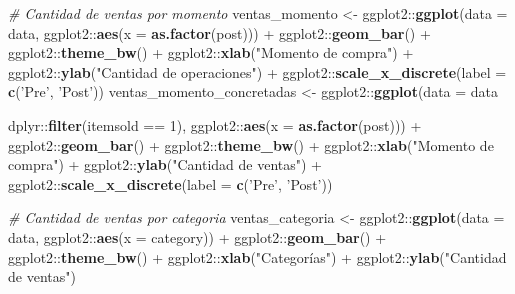\documentclass[
  12pt]{article}
\newenvironment{Shaded}{}{}
\newcommand{\CommentTok}[1]{\textcolor[rgb]{0.38,0.63,0.69}{\textit{#1}}}
\newcommand{\DataTypeTok}[1]{\textcolor[rgb]{0.56,0.13,0.00}{#1}}
\newcommand{\DecValTok}[1]{\textcolor[rgb]{0.25,0.63,0.44}{#1}}
\newcommand{\KeywordTok}[1]{\textcolor[rgb]{0.00,0.44,0.13}{\textbf{#1}}}
\newcommand{\NormalTok}[1]{#1}
\newcommand{\OperatorTok}[1]{\textcolor[rgb]{0.40,0.40,0.40}{#1}}
\newcommand{\StringTok}[1]{\textcolor[rgb]{0.25,0.44,0.63}{#1}}
\begin{document}
\begin{Shaded}
\begin{Highlighting}[]
{{{\CommentTok{# Cantidad de ventas por momento}
\NormalTok{ventas_momento <-}\StringTok{ }\NormalTok{ggplot2}\OperatorTok{::}\KeywordTok{ggplot}\NormalTok{(}\DataTypeTok{data =}\NormalTok{ data, ggplot2}\OperatorTok{::}\KeywordTok{aes}\NormalTok{(}\DataTypeTok{x =} \KeywordTok{as.factor}\NormalTok{(post))) }\OperatorTok{+}
\StringTok{  }\NormalTok{ggplot2}\OperatorTok{::}\KeywordTok{geom_bar}\NormalTok{() }\OperatorTok{+}
\StringTok{  }\NormalTok{ggplot2}\OperatorTok{::}\KeywordTok{theme_bw}\NormalTok{() }\OperatorTok{+}
\StringTok{  }\NormalTok{ggplot2}\OperatorTok{::}\KeywordTok{xlab}\NormalTok{(}\StringTok{"Momento de compra"}\NormalTok{) }\OperatorTok{+}\StringTok{ }\NormalTok{ggplot2}\OperatorTok{::}\KeywordTok{ylab}\NormalTok{(}\StringTok{"Cantidad de operaciones"}\NormalTok{) }\OperatorTok{+}
\StringTok{  }\NormalTok{ggplot2}\OperatorTok{::}\KeywordTok{scale_x_discrete}\NormalTok{(}\DataTypeTok{label =} \KeywordTok{c}\NormalTok{(}\StringTok{'Pre'}\NormalTok{, }\StringTok{'Post'}\NormalTok{))}
\NormalTok{ventas_momento_concretadas <-}\StringTok{ }\NormalTok{ggplot2}\OperatorTok{::}\KeywordTok{ggplot}\NormalTok{(}\DataTypeTok{data =}\NormalTok{ data }\OperatorTok{%>%}
\StringTok{                                                }\NormalTok{dplyr}\OperatorTok{::}\KeywordTok{filter}\NormalTok{(itemsold }\OperatorTok{==}\StringTok{ }\DecValTok{1}\NormalTok{),}
\NormalTok{                                              ggplot2}\OperatorTok{::}\KeywordTok{aes}\NormalTok{(}\DataTypeTok{x =} \KeywordTok{as.factor}\NormalTok{(post))) }\OperatorTok{+}
\StringTok{  }\NormalTok{ggplot2}\OperatorTok{::}\KeywordTok{geom_bar}\NormalTok{() }\OperatorTok{+}
\StringTok{  }\NormalTok{ggplot2}\OperatorTok{::}\KeywordTok{theme_bw}\NormalTok{() }\OperatorTok{+}
\StringTok{  }\NormalTok{ggplot2}\OperatorTok{::}\KeywordTok{xlab}\NormalTok{(}\StringTok{"Momento de compra"}\NormalTok{) }\OperatorTok{+}\StringTok{ }\NormalTok{ggplot2}\OperatorTok{::}\KeywordTok{ylab}\NormalTok{(}\StringTok{"Cantidad de ventas"}\NormalTok{) }\OperatorTok{+}
\StringTok{  }\NormalTok{ggplot2}\OperatorTok{::}\KeywordTok{scale_x_discrete}\NormalTok{(}\DataTypeTok{label =} \KeywordTok{c}\NormalTok{(}\StringTok{'Pre'}\NormalTok{, }\StringTok{'Post'}\NormalTok{))}

\CommentTok{# Cantidad de ventas por categoria}
\NormalTok{ventas_categoria <-}\StringTok{ }\NormalTok{ggplot2}\OperatorTok{::}\KeywordTok{ggplot}\NormalTok{(}\DataTypeTok{data =}\NormalTok{ data, ggplot2}\OperatorTok{::}\KeywordTok{aes}\NormalTok{(}\DataTypeTok{x =}\NormalTok{ category)) }\OperatorTok{+}
\StringTok{  }\NormalTok{ggplot2}\OperatorTok{::}\KeywordTok{geom_bar}\NormalTok{() }\OperatorTok{+}
\StringTok{  }\NormalTok{ggplot2}\OperatorTok{::}\KeywordTok{theme_bw}\NormalTok{() }\OperatorTok{+}
\StringTok{  }\NormalTok{ggplot2}\OperatorTok{::}\KeywordTok{xlab}\NormalTok{(}\StringTok{"Categorías"}\NormalTok{) }\OperatorTok{+}\StringTok{ }\NormalTok{ggplot2}\OperatorTok{::}\KeywordTok{ylab}\NormalTok{(}\StringTok{"Cantidad de ventas"}\NormalTok{)}

}}}}
\end{Highlighting}
\end{Shaded}
\end{document}
